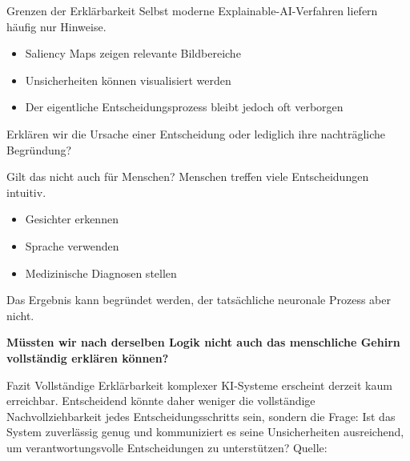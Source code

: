\documentclass[aspectratio=169]{beamer}
\begin{document}
\begin{frame}{Grenzen der Erklärbarkeit}
 Selbst moderne Explainable-AI-Verfahren
liefern häufig nur Hinweise.
\vspace{0.2cm}
\begin{itemize}
 \item Saliency Maps zeigen relevante Bildbereiche
 \item Unsicherheiten können visualisiert werden
 \item Der eigentliche Entscheidungsprozess bleibt
  jedoch oft verborgen
\end{itemize}
\vspace{0.2cm}
\rightarrow \vspace{0.1cm} Erklären wir die Ursache einer Entscheidung
  oder lediglich ihre nachträgliche Begründung? \parencite{rudinStopExplainingBlack2019}
\end{frame}

\begin{frame}{Gilt das nicht auch für Menschen?}
Menschen treffen viele Entscheidungen intuitiv.
\vspace{0.2cm}
\begin{itemize}
\item Gesichter erkennen
\item Sprache verwenden
\item Medizinische Diagnosen stellen
\end{itemize}
\vspace{0.2cm}
Das Ergebnis kann begründet werden,
der tatsächliche neuronale Prozess aber nicht. \parencite{nisbettTellingMoreWe1977}
\newline
\vspace{0.5cm}
\begin{center}
\textbf{Müssten wir nach derselben Logik nicht auch das menschliche Gehirn vollständig erklären können?}
\end{center}

\end{frame}

\begin{frame}{Fazit}
Vollständige Erklärbarkeit komplexer KI-Systeme
erscheint derzeit kaum erreichbar.\newline\newline
Entscheidend könnte daher weniger die vollständige
Nachvollziehbarkeit jedes Entscheidungsschritts
sein, sondern die Frage:\newline\newline
Ist das System zuverlässig genug und kommuniziert
es seine Unsicherheiten ausreichend, um
verantwortungsvolle Entscheidungen zu unterstützen?
 \vfill
  {\tiny Quelle: }
\end{frame}
\end{document}
